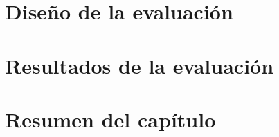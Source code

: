 \label{cap:evaluacion}

\section{Diseño de la evaluación}

\section{Resultados de la evaluación}

\section{Resumen del capítulo}